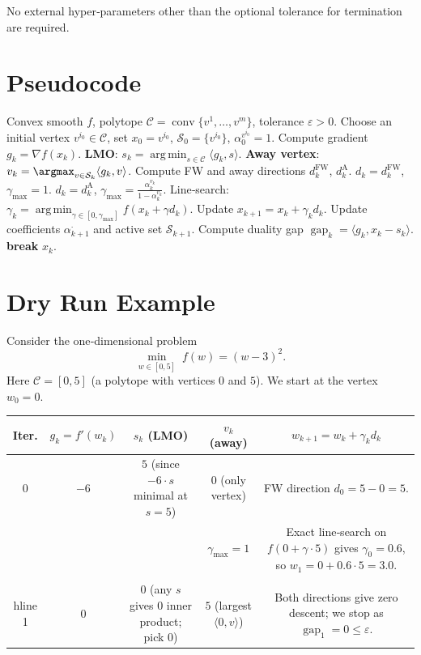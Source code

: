 \documentclass{article}
\newcommand{\C}{\mathcal{C}}
\newcommand{\gap}{\operatorname{gap}}
\newcommand{\argmin}{\operatorname*{arg\,min}}
\begin{document}
No external hyper‑parameters other than the optional tolerance for termination are required.

\section*{Pseudocode}
\begin{algorithm}[H]
\caption{Away‑Step Frank–Wolfe (AFW)}
\begin{algorithmic}[1]
\Require Convex smooth $f$, polytope $\C=\operatorname{conv}\{v^{1},\dots ,v^{m}\}$,
tolerance $\varepsilon>0$.
\State Choose an initial vertex $v^{i_{0}}\in\C$, set $x_{0}=v^{i_{0}}$, 
$\mathcal{S}_{0}=\{v^{i_{0}}\}$, $\alpha_{0}^{v^{i_{0}}}=1$.
    \State Compute gradient $g_{k}= \nabla f(x_{k})$.
    \State \textbf{LMO}: $s_{k}= \argmin_{s\in\C}\langle g_{k},s\rangle$.
    \State \textbf{Away vertex}: $v_{k}= \argmax_{v\in\mathcal{S}_{k}}\langle g_{k},v\rangle$.
    \State Compute FW and away directions $d_{k}^{\text{FW}}$, $d_{k}^{\text{A}}$.
        \State $d_{k}=d_{k}^{\text{FW}}$, $\gamma_{\max}=1$.
    \Else
        \State $d_{k}=d_{k}^{\text{A}}$, 
              $\displaystyle \gamma_{\max}= \frac{\alpha_{k}^{v_{k}}}{1-\alpha_{k}^{v_{k}}}$.
    \EndIf
    \State Line‑search: $\displaystyle \gamma_{k}= \argmin_{\gamma\in[0,\gamma_{\max}]} f(x_{k}+ \gamma d_{k})$.
    \State Update $x_{k+1}=x_{k}+ \gamma_{k} d_{k}$.
    \State Update coefficients $\alpha_{k+1}^{\cdot}$ and active set $\mathcal{S}_{k+1}$.
    \State Compute duality gap $\gap_{k}= \langle g_{k},x_{k}-s_{k}\rangle$.
    \If{$\gap_{k}\le \varepsilon$}
        \State \textbf{break}
    \EndIf
\EndFor
\State \Return $x_{k}$.
\end{algorithmic}
\end{algorithm}

\section*{Dry Run Example}
Consider the one‑dimensional problem
\[
\min_{w\in[0,5]}\; f(w)= (w-3)^{2}.
\]
Here $\C=[0,5]$ (a polytope with vertices $0$ and $5$).  
We start at the vertex $w_{0}=0$.

\begin{center}
\begin{tabular}{c|c|c|c|c}
\textbf{Iter.}&$g_{k}=f'(w_{k})$&$s_{k}$ (LMO)&$v_{k}$ (away)&$w_{k+1}=w_{k}+\gamma_{k}d_{k}$\\\hline
0&$-6$&$5$ (since $-6\cdot s$ minimal at $s=5$)&$0$ (only vertex)&FW direction $d_{0}=5-0=5$.\\
 & & & $\gamma_{\max}=1$ & Exact line‑search on $f(0+\gamma\cdot5)$ gives $\gamma_{0}=0.6$,
 so $w_{1}=0+0.6\cdot5=3.0$.\\\\hline
1&$0$&$0$ (any $s$ gives $0$ inner product; pick $0$)&$5$ (largest $\langle0, v\rangle$)&Both directions give zero descent; we stop as $\gap_{1}=0\le\varepsilon$.\end{tabular}
\end{center}
\end{document}

